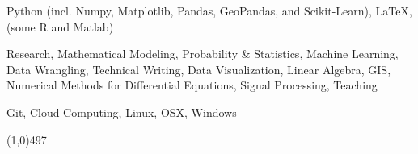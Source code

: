 \documentclass[10pt]{article} %
\begin{document}
\noindent

 Python (incl. Numpy, Matplotlib, Pandas, GeoPandas, and Scikit-Learn), \LaTeX, (some R and Matlab)

Research, Mathematical Modeling, Probability \& Statistics, Machine Learning, Data Wrangling, Technical Writing, Data Visualization, Linear Algebra,
GIS, Numerical Methods for Differential Equations, Signal Processing, Teaching


Git, Cloud Computing, Linux, OSX, Windows


\vspace{-2mm}
\noindent
\line(1,0){497}\\
\vspace{-3.5mm}

\end{document}
